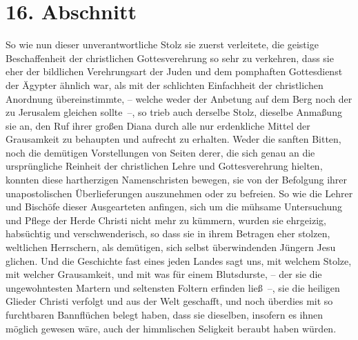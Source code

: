 \section{16. Abschnitt} \label{kap7_ab16}

So wie nun dieser unverantwortliche Stolz sie zuerst verleitete, die geistige
Beschaffenheit der christlichen Gottesverehrung so sehr
zu verkehren, dass sie
eher der bildlichen Verehrungsart der Juden und dem
pomphaften Gottesdienst
der Ägypter ähnlich war, als mit der schlichten
Einfachheit der christlichen
Anordnung übereinstimmte, -- welche weder der Anbetung auf dem Berg noch der zu
Jerusalem gleichen sollte~--, so trieb auch derselbe
Stolz, dieselbe
Anmaßung sie an, den Ruf ihrer großen Diana durch alle
nur erdenkliche
Mittel der Grausamkeit zu behaupten und aufrecht zu erhalten. Weder die sanften
Bitten, noch die demütigen Vorstellungen von Seiten derer, die sich genau an
die ursprüngliche Reinheit der christlichen Lehre und
Gottesverehrung hielten,
konnten diese hartherzigen Namenschristen
bewegen, sie von der Befolgung ihrer
unapostolischen Überlieferungen
auszunehmen oder zu befreien. So wie die Lehrer
und Bischöfe dieser Ausgearteten anfingen, sich um die
mühsame Untersuchung und
Pflege der Herde Christi nicht mehr zu kümmern, wurden sie ehrgeizig,
habsüchtig und verschwenderisch, so dass sie in ihrem Betragen eher stolzen, weltlichen
Herrschern, als demütigen, sich selbst
überwindenden
Jüngern Jesu glichen.
Und die Geschichte fast eines jeden Landes sagt uns, mit welchem Stolze, mit
welcher Grausamkeit, und mit was für einem Blutsdurste, --
der sie die
ungewohntesten Martern und seltensten Foltern erfinden
ließ~--, sie die
heiligen Glieder Christi
verfolgt und aus der Welt geschafft, und noch
überdies mit so furchtbaren Bannflüchen belegt haben, dass
sie
dieselben,
insofern es ihnen möglich gewesen wäre, auch der himmlischen
Seligkeit beraubt
haben würden.

\medskip

